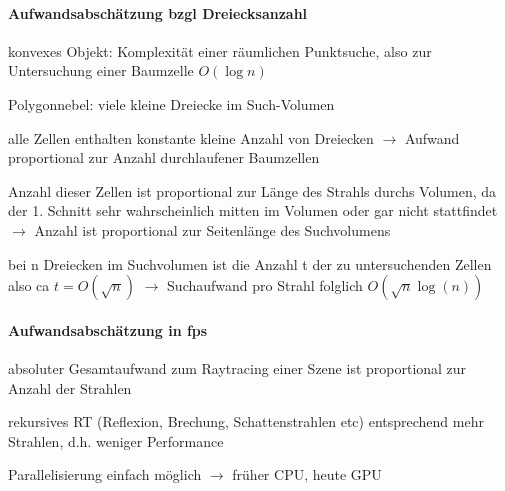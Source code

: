 \documentclass[landscape]{article}
\begin{document}
\begin{multicols}{3}
  \paragraph{Aufwandsabschätzung bzgl Dreiecksanzahl}
  \begin{itemize*}
    \item konvexes Objekt: Komplexität einer räumlichen Punktsuche, also zur Untersuchung einer Baumzelle $O(\log n)$
    \item Polygonnebel: viele kleine Dreiecke im Such-Volumen
    \item alle Zellen enthalten konstante kleine Anzahl von Dreiecken $\rightarrow$ Aufwand proportional zur Anzahl durchlaufener Baumzellen
    \item Anzahl dieser Zellen ist proportional zur Länge des Strahls durchs Volumen, da der 1. Schnitt sehr wahrscheinlich mitten im Volumen oder gar nicht stattfindet $\rightarrow$ Anzahl ist proportional zur Seitenlänge des Suchvolumens
    \item bei n Dreiecken im Suchvolumen ist die Anzahl t der zu untersuchenden Zellen also ca $t=O(\sqrt{n})$ $\rightarrow$ Suchaufwand pro Strahl folglich $O(\sqrt{n} \log (n))$
  \end{itemize*}
  
  \paragraph{Aufwandsabschätzung in fps}
  \begin{itemize*}
    \item absoluter Gesamtaufwand zum Raytracing einer Szene ist proportional zur Anzahl der Strahlen
    \item rekursives RT (Reflexion, Brechung, Schattenstrahlen etc) entsprechend mehr Strahlen, d.h. weniger Performance
    \item Parallelisierung einfach möglich $\rightarrow$ früher CPU, heute GPU
  \end{itemize*}
  

\end{multicols}
\end{document}
